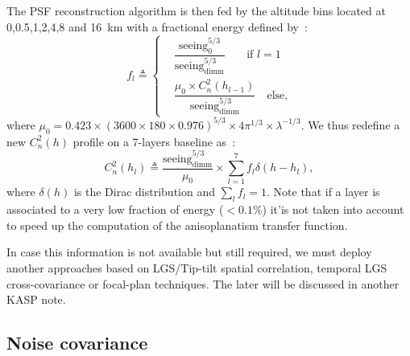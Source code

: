 \documentclass[12pt]{article}
\begin{document}
The PSF reconstruction algorithm is then fed by the altitude bins located at 0,0.5,1,2,4,8 and 16~km with a fractional energy defined by~:
\begin{equation}
	f_l \triangleq \left\lbrace
\begin{aligned}
&\dfrac{\text{seeing}_0^{5/3}}{\text{seeing}^{5/3}_\text{dimm}} \quad\:\:\:\:\text{if $l=1$}\\
& \dfrac{\mu_0\times C_n^2(h_{l-1})}{\text{seeing}^{5/3}_\text{dimm}} \quad\text{else,}
\end{aligned}
\right.
\end{equation}
where $\mu_0 = 0.423\times(3600\times180\times0.976)^{5/3}\times4\pi^{1/3} \times\lambda^{-1/3}$. We thus redefine a new $C_n^2(h)$ profile on a 7-layers baseline as~:
\begin{equation}
	C_n^2(h_l) \triangleq \dfrac{\text{seeing}^{5/3}_\text{dimm}}{\mu_0}\times \sum_{l=1}^{7}f_l\delta(h-h_l),
\end{equation}
where $\delta(h)$ is the Dirac distribution and $\sum_l f_l = 1$. Note that if a layer is associated to a very low fraction of energy ($<0.1\%$) it'is not taken into account to speed up the computation of the anisoplanatism transfer function.

In case this information is not available but still required, we must deploy another approaches based on LGS/Tip-tilt spatial correlation, temporal LGS cross-covariance or focal-plan techniques. The later will be discussed in another KASP note.

\subsection{Noise covariance}
\end{document}

